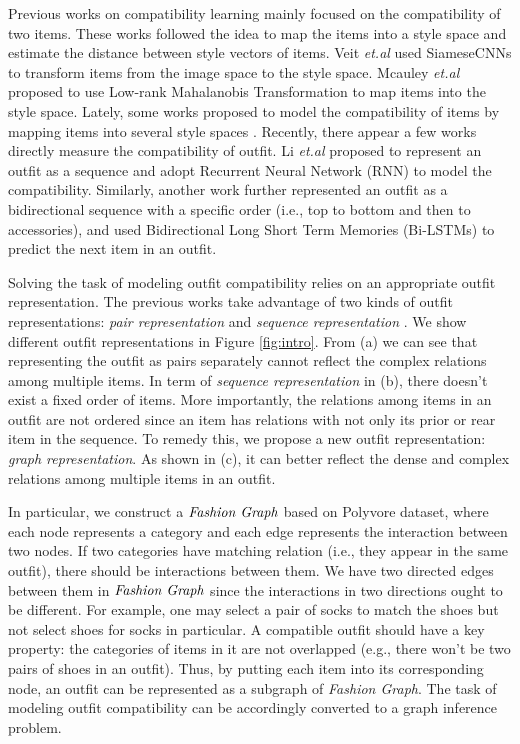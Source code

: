 \documentclass[sigconf]{acmart}
\begin{document}
Previous works on compatibility learning mainly focused on the compatibility of two items. These works followed the idea to map the items into a style space and estimate the distance between style vectors of items.
 Veit \emph{et.al} used SiameseCNNs \cite{veit2015learning,Bell2015Learning} to transform items from the image space to the style space.
Mcauley \emph{et.al} \cite{mcauley2015image} proposed to use Low-rank Mahalanobis Transformation to map items into the style space. Lately, some works proposed to model the compatibility of items by mapping items into several style spaces \cite{he2016learning,shih2018compatibility}.
Recently, there appear a few works directly measure the compatibility of outfit.
Li \emph{et.al} \cite{li2017mining} proposed to represent an outfit as a sequence and adopt Recurrent Neural Network (RNN) \cite{mikolov2010recurrent,mikolov2011extensions,hochreiter1997long,gers1999learning,sundermeyer2012lstm,liu2016predicting,cui2018mv} to model the compatibility.
Similarly, another work \cite{han2017learning} further represented an outfit as a bidirectional sequence with a specific order (i.e., top to bottom and then to accessories), and used Bidirectional Long Short Term Memories (Bi-LSTMs) to predict the next item in an outfit.


Solving the task of modeling outfit compatibility relies on an appropriate outfit representation. The previous works take advantage of two kinds of outfit representations: \emph{pair representation} \cite{veit2015learning,mcauley2015image,he2016learning,shih2018compatibility}
and \emph{sequence representation} \cite{han2017learning}.
We show different outfit representations in Figure \ref{fig:intro}.
From (a) we can see that representing the outfit as pairs separately cannot reflect the complex relations among multiple items.
 In term of \emph{sequence representation} in (b), there doesn't exist a fixed order of items. More importantly, the relations among items in an outfit are not ordered since an item has relations with not only its prior or rear item in the sequence.
To remedy this, we propose a new outfit representation: \emph{graph representation}. As shown in (c), it can better reflect the dense and complex relations among multiple items in an outfit.



In particular, we construct a $\emph{Fashion Graph}$ based on Polyvore dataset, where each node represents a category and each edge represents the interaction between two nodes. If two categories have matching relation (i.e., they appear in the same outfit), there should be interactions between them. We have two directed edges between them in $\emph{Fashion Graph}$ since the interactions in two directions ought to be different. For example, one may select a pair of socks to match the shoes but not select shoes for socks in particular.
A compatible outfit should have a key property: the categories of items in it are not overlapped (e.g., there won't be two pairs of shoes in an outfit).
Thus, by putting each item into its corresponding node, an outfit can be represented as a subgraph of \emph{Fashion Graph}.
The task of modeling outfit compatibility can be accordingly converted to a graph inference problem.
\end{document}
